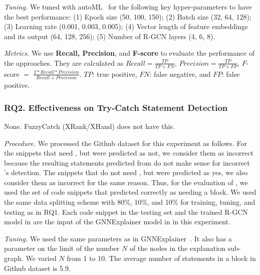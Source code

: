 {\em Tuning.} We tuned {\tool} with autoML~\cite{NNI} for the
following key hyper-parameters to have the best performance: (1) Epoch
size (50, 100, 150); (2) Batch size (32, 64, 128); (3) Learning rate
(0.001, 0.003, 0.005); (4) Vector length of feature embeddings and its
output (64, 128, 256); (5) Number of R-GCN layers (4, 6, 8).

{\em Metrics.} We use \textbf{Recall, Precision}, and {\bf F-score} to
evaluate the performance of the approaches. They are calculated as
$Recall = \frac{TP}{TP+FN}$, $Precision = \frac{TP}{TP+FP}$, $F$-score
$=$ $\frac{2*Recall*Precision}{Recall+Precision}$. $TP$: true
positive, $FN$: false negative, and $FP$: false positive.

\subsubsection{RQ2. Effectiveness on Try-Catch Statement Detection\\}

 None. FuzzyCatch (XRank/XHand) does not have
this.

{\em Procedure.} We processed the Github dataset for this experiment
as follows. For the snippets that need , but were
predicted as not, we consider them as incorrect because the resulting
statements predicted from {\xstate} do not make sense for incorrect
{\xblock}'s detection. The snippets that do not need ,
but were predicted as yes, we also consider them as incorrect for the
same reason. Thus, for the evaluation of {\xstate}, we used the set of
code snippets that {\xblock} predicted correctly as needing a
 block. We used the same data splitting scheme with
80\%, 10\%, and 10\% for training, tuning, and testing as in RQ1. Each code
snippet in the testing set and the trained R-GCN model in {\xblock}
are the input of the GNNExplainer model in {\xstate} in this
experiment.


{\em Tuning.} We used the same parameters as in
GNNExplainer~\cite{GNNExplainer}. It also has a parameter on the limit
of the number $N$ of the nodes in the explanation sub-graph. We
varied $N$ from 1 to 10. The average number of statements in a
 block in Github dataset is 5.9.

